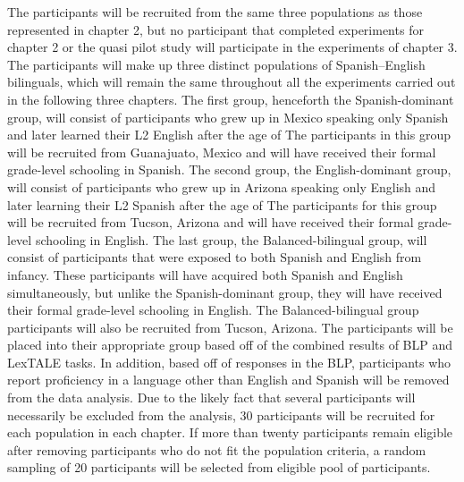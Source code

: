 The participants will be recruited from the same three populations as those represented in chapter 2, but no participant that completed experiments for chapter 2 or the quasi pilot study will participate in the experiments of chapter 3. The participants will make up three distinct populations of Spanish–English bilinguals, which will remain the same throughout all the experiments carried out in the following three chapters. The first group, henceforth the Spanish-dominant group, will consist of participants who grew up in Mexico speaking only Spanish and later learned their L2 English after the age of %
The participants in this group will be recruited from Guanajuato, Mexico and will have received their formal grade-level schooling in Spanish. The second group, the English-dominant group, will consist of participants who grew up in Arizona speaking only English and later learning their L2 Spanish after the age of %
The participants for this group will be recruited from Tucson, Arizona and will have received their formal grade-level schooling in English. The last group, the Balanced-bilingual group, will consist of participants that were exposed to both Spanish and English from infancy. These participants will have acquired both Spanish and English simultaneously, but unlike the Spanish-dominant group, they will have received their formal grade-level schooling in English. The Balanced-bilingual group participants will also be recruited from Tucson, Arizona. The participants will be placed into their appropriate group based off of the combined results of BLP and LexTALE tasks. In addition, based off of responses in the BLP, participants who report proficiency in a language other than English and Spanish will be removed from the data analysis. Due to the likely fact that several participants will necessarily be excluded from the analysis, 30 participants will be recruited for each population in each chapter. If more than twenty participants remain eligible after removing participants who do not fit the population criteria, a random sampling of 20 participants will be selected from eligible pool of participants.

